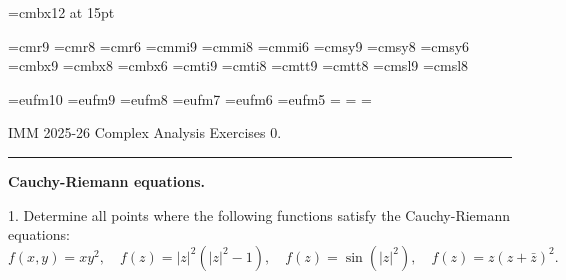 \magnification\magstephalf
\newcount\newpen{}
\font\bigtitlefont=cmbx12 at 15pt
\def\R{{\bf R}}
\def\C{{\bf C}}
\def\Z{{\bf Z}}
\def\Log{{\rm Log}}

\font\ninerm=cmr9  \font\eightrm=cmr8  \font\sixrm=cmr6
\font\ninei=cmmi9  \font\eighti=cmmi8  \font\sixi=cmmi6
\font\ninesy=cmsy9 \font\eightsy=cmsy8 \font\sixsy=cmsy6
\font\ninebf=cmbx9 \font\eightbf=cmbx8 \font\sixbf=cmbx6
\font\nineit=cmti9 \font\eightit=cmti8 
\font\ninett=cmtt9 \font\eighttt=cmtt8 
\font\ninesl=cmsl9 \font\eightsl=cmsl8


\font\tengoth=eufm10  \font\ninegoth=eufm9
\font\eightgoth=eufm8 \font\sevengoth=eufm7 
\font\sixgoth=eufm6   \font\fivegoth=eufm5
\newfam\gothfam \def\goth{\fam\gothfam\tengoth} 
\textfont\gothfam=\tengoth
\scriptfont\gothfam=\sevengoth 
\scriptscriptfont\gothfam=\fivegoth

\newskip\ttglue

\def\eightpoint{\def\rm{\fam0\eightrm}
  \textfont0=\eightrm \scriptfont0=\sixrm
  \scriptscriptfont0\fiverm
  \textfont1=\eighti \scriptfont1=\sixi
  \scriptscriptfont1\fivei 
  \textfont2=\eightsy \scriptfont2=\sixsy
  \scriptscriptfont2\fivesy 
  \textfont3=\tenex \scriptfont3=\tenex
  \scriptscriptfont3\tenex 
  \textfont\itfam=\eightit\def\it{\fam\itfam\eightit}%
  \textfont\slfam=\eightsl\def\sl{\fam\slfam\eightsl}%
  \textfont\ttfam=\eighttt\def\tt{\fam\ttfam\eighttt}%
  \textfont\gothfam=\eightgoth\scriptfont\gothfam=\sixgoth 
  \scriptscriptfont\gothfam=\fivegoth
  \def\goth{\fam\gothfam\tengoth}
  \textfont\bffam=\eightbf\scriptfont\bffam=\sixbf
  \scriptscriptfont\bffam=\fivebf
  \def\bf{\fam\bffam\eightbf}%
  \tt\ttglue=.5em plus.25em minus.15em
  \normalbaselineskip=9pt \setbox\strutbox\hbox{\vrule
  height7pt depth2pt width0pt}%
  \let\big=\eightbig\normalbaselines\rm}

\def\pn{\par\noindent}
\def\sn{\smallskip\noindent}
\def\mn{\medskip\noindent}
\def\bn{\bigskip\noindent}


\bigskip\bigskip\bigskip\bigskip
\noindent
IMM 2025-26 \quad Complex Analysis \quad Exercises 0.   \hfill  \smallskip
\hrule


\bn
{\bf Cauchy-Riemann equations.}
\bn
\item{1.} Determine all points where the following functions satisfy the Cauchy-Riemann equations: 
$$f(x,y)=xy^2,\quad f(z)=|z|^2(|z|^2-1),\quad f(z)=\sin (|z|^2),\quad f(z)=z(z+\bar z)^2.$$

